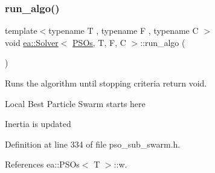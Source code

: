 \subsubsection{\texorpdfstring{run\+\_\+algo()}{run\_algo()}}
{\footnotesize\ttfamily template$<$typename T , typename F , typename C $>$ \\
void \hyperlink{classea_1_1_solver}{ea\+::\+Solver}$<$ \hyperlink{structea_1_1_p_s_os}{P\+S\+Os}, T, F, C $>$\+::run\+\_\+algo (\begin{DoxyParamCaption}{ }\end{DoxyParamCaption})\hspace{0.3cm}{\ttfamily [private]}}



Runs the algorithm until stopping criteria return void. 

Local Best Particle Swarm starts here

Inertia is updated 

Definition at line 334 of file pso\+\_\+sub\+\_\+swarm.\+h.



References ea\+::\+P\+S\+Os$<$ T $>$\+::w.


